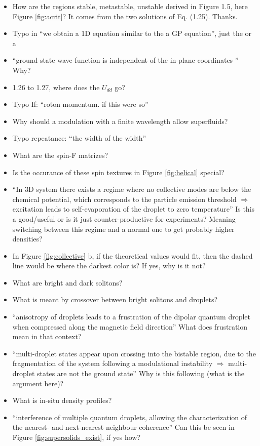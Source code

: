 \begin{itemize}
        \item How are the regions stable, metastable, unstable derived in Figure 1.5, here Figure \ref{fig:acrit}? 
        {\color{red}
            It comes from the two solutions of Eq. (1.25).
        }
        {\color{green}
            Thanks.
        }

\end{itemize}

\begin{itemize}
        \item Typo in ``we obtain a 1D equation similar to the a GP equation'', just the or a
        \item ``ground-state wave-function is independent of the in-plane coordinates '' Why?
        \item 1.26 to 1.27, where does the $U_{dd}$ go?
        \item Typo If: ``roton momentum. if this were so''
        \item Why should a modulation with a finite wavelength allow superfluids?
        \item Typo repeatance: ``the width of the width''
        \item What are the spin-F matrizes?
        \item Is the occurance of these spin textures in Figure \ref{fig:helical} special?
        \item ``In 3D system there exists a regime where no collective modes are below the chemical potential, which corresponds to the particle emission threshold $\Rightarrow$ excitation leads to self-evaporation of the droplet to zero temperature'' Is this a good/useful or is it just counter-productive for experiments? Meaning switching between this regime and a normal one to get probably higher densities?
        \item In Figure \ref{fig:collective} b, if the theoretical values would fit, then the dashed line would be where the darkest color is? If yes, why is it not?
        \item What are bright and dark solitons?
        \item What is meant by crossover between bright solitons and droplets?
        \item ``anisotropy of droplets leads to a frustration of the dipolar quantum droplet when
compressed along the magnetic field direction'' What does frustration mean in that context?
        \item ``multi-droplet states appear upon crossing into the bistable region, due to the fragmentation of the system following a modulational instability $\Rightarrow$ multi-droplet states are not the ground state'' Why is this following (what is the argument here)?
        \item What is in-situ density profiles?
        \item ``interference of multiple quantum droplets, allowing the characterization of the nearest- and next-nearest neighbour coherence'' Can this be seen in Figure \ref{fig:supersolids_exist}, if yes how?

\end{itemize}

